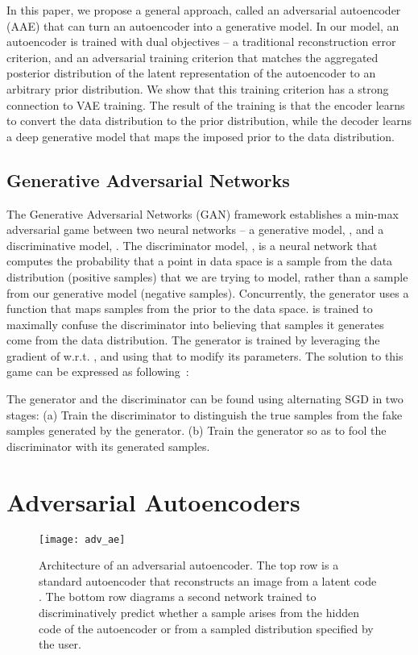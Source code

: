 \documentclass{article}
\begin{document}
In this paper, we propose a general approach, called an adversarial autoencoder (AAE) that can turn an autoencoder into a generative model.
In our model, an autoencoder is trained with dual objectives -- a traditional reconstruction error criterion, and an adversarial training
criterion \citep{gan} that matches the aggregated posterior distribution of the latent representation of the autoencoder to an arbitrary prior distribution.
We show that this training criterion has a strong connection to VAE training.  The result of the training is that the encoder learns to
convert the data distribution to the prior distribution, while the decoder learns a deep generative model that maps the imposed prior to the data distribution.


\subsection{Generative Adversarial Networks}
The Generative Adversarial Networks (GAN) \citep{gan} framework establishes a min-max adversarial game between two neural networks -- a generative model, ,
and a discriminative model, .  The discriminator model, , is a neural network that computes the probability that a point  in
data space is a sample from the data distribution (positive samples) that we are trying to model, rather than a sample from our generative model (negative samples).
Concurrently, the generator uses a function  that maps samples  from the prior  to the data space.  is
trained to maximally confuse the discriminator into believing that samples it generates come from the data distribution. The generator is trained by leveraging
the gradient of  w.r.t. , and using that to modify its parameters.
The solution to this game can be expressed as following~\citep{gan}:


The generator  and the discriminator  can be found using alternating SGD in two stages: (a) Train the discriminator to distinguish the true samples from the fake samples generated by the generator.
(b) Train the generator so as to fool the discriminator with its generated samples.


\section{Adversarial Autoencoders}

\begin{figure}
\begin{center}
\hspace{4cm}\texttt{[image: adv\_ae]}
\end{center}
\caption{\label{fig_adv_ae}Architecture of an adversarial autoencoder.
The top row is a standard autoencoder that reconstructs an image  from a latent code .
The bottom row diagrams a second network trained to discriminatively predict whether a sample arises from the hidden code of the autoencoder or from a sampled distribution specified by the user.}
\end{figure}
\end{document}
